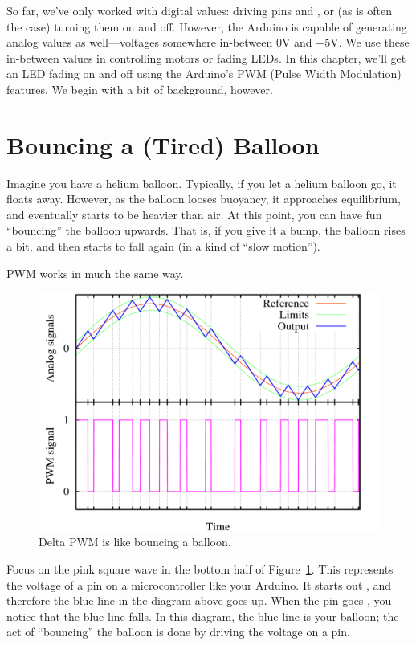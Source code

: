 So far, we've only worked with {\strong digital} values: driving pins \HIGH and \LOW, or (as is often the case) turning them on and off. However, the Arduino is capable of generating analog values as well---voltages somewhere in-between 0V and +5V. We use these in-between values in controlling motors or fading LEDs. In this chapter, we'll get an LED fading on and off using the Arduino's PWM (Pulse Width Modulation) features. We begin with a bit of background, however.

\section{Bouncing a (Tired) Balloon}
Imagine you have a helium balloon. Typically, if you let a helium balloon go, it floats away. However, as the balloon looses buoyancy, it approaches equilibrium, and eventually starts to be heavier than air. At this point, you can have fun ``bouncing'' the balloon upwards. That is, if you give it a bump, the balloon rises a bit, and then starts to fall again (in a kind of ``slow motion'').

PWM works in much the same way.

\newpage


\vspace{3mm}
\begin{figure}[ht]
  \begin{center}
    \includegraphics[width=0.9\linewidth]{images/ch7-delta-pwm}
    \caption{Delta PWM is like bouncing a balloon.}
    \label{image:ch7-delta-pwm}
  \end{center}
\end{figure}

Focus on the pink square wave in the bottom half of  Figure~\ref{image:ch7-delta-pwm}. This represents the voltage of a pin on a microcontroller like your Arduino. It starts out \HIGH, and therefore the blue line in the diagram above goes up. When the pin goes \LOW, you notice that the blue line falls. In this diagram, the blue line is your balloon; the act of ``bouncing'' the balloon is done by driving the voltage \HIGH on a pin.

